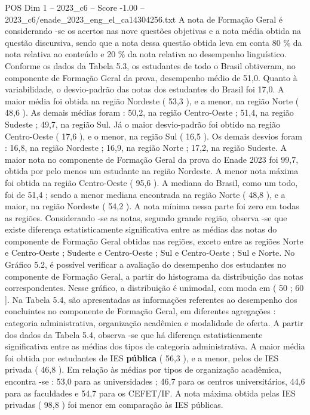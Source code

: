 \begin{textsample}{POS Dim 1 – 2023\_c6 – Score -1.00 – 2023\_c6/enade\_2023\_eng\_el\_ca14304256.txt}
A nota de Formação Geral é considerando -se os acertos nas nove questões objetivas e a nota média obtida na questão discursiva, sendo que a nota dessa questão obtida leva em conta 80 \% da nota relativa ao conteúdo e 20 \% da nota relativa ao desempenho linguístico.
Conforme os dados da Tabela 5.3, os estudantes de todo o Brasil obtiveram, no componente de Formação Geral da prova, desempenho médio de 51,0.
Quanto à variabilidade, o desvio-padrão das notas dos estudantes do Brasil foi 17,0.
A maior média foi obtida na região Nordeste ( 53,3 ), e a menor, na região Norte ( 48,6 ).
As demais médias foram : 50,2, na região Centro-Oeste ; 51,4, na região Sudeste ; 49,7, na região Sul.
Já o maior desvio-padrão foi obtido na região Centro-Oeste ( 17,6 ), e o menor, na região Sul ( 16,5 ).
Os demais desvios foram : 16,8, na região Nordeste ; 16,9, na região Norte ; 17,2, na região Sudeste.
A maior nota no componente de Formação Geral da prova do Enade 2023 foi 99,7, obtida por pelo menos um estudante na região Nordeste.
A menor nota máxima foi obtida na região Centro-Oeste ( 95,6 ).
A mediana do Brasil, como um todo, foi de 51,4 ; sendo a menor mediana encontrada na região Norte ( 48,8 ), e a maior, na região Nordeste ( 54,2 ).
A nota mínima nessa parte foi zero em todas as regiões.
Considerando -se as notas, segundo grande região, observa -se que existe diferença estatisticamente significativa entre as médias das notas do componente de Formação Geral obtidas nas regiões, exceto entre as regiões Norte e Centro-Oeste ; Sudeste e Centro-Oeste ; Sul e Centro-Oeste ; Sul e Norte.
No Gráfico 5.2, é possível verificar a avaliação do desempenho dos estudantes no componente de Formação Geral, a partir do histograma da distribuição das notas correspondentes.
Nesse gráfico, a distribuição é unimodal, com moda em ( 50 ; 60 ].
Na Tabela 5.4, são apresentadas as informações referentes ao desempenho dos concluintes no componente de Formação Geral, em diferentes agregações : categoria administrativa, organização acadêmica e modalidade de oferta.
A partir dos dados da Tabela 5.4, observa -se que há diferença estatisticamente significativa entre as médias dos tipos de categoria administrativa.
A maior média foi obtida por estudantes de IES \textbf{pública} ( 56,3 ), e a menor, pelos de IES privada ( 46,8 ).
Em relação às médias por tipos de organização acadêmica, encontra -se : 53,0 para as universidades ; 46,7 para os centros universitários, 44,6 para as faculdades e 54,7 para os CEFET/IF.
A nota máxima obtida pelas IES privadas ( 98,8 ) foi menor em comparação às IES públicas.

\end{textsample}
